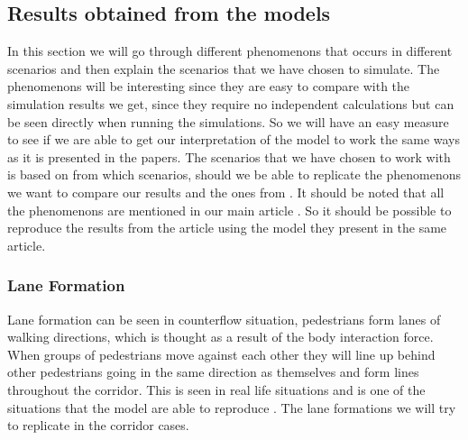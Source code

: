 \subsection{Results obtained from the models}
In this section we will go through different phenomenons that occurs in different scenarios and then
explain the scenarios that we have chosen to simulate. The phenomenons will be interesting since they
are easy to compare with the simulation results we get, since they require no independent calculations
but can be seen directly when running the simulations. So we will have an easy measure to see if we
are able to get our interpretation of the model to work the same ways as it is presented in the papers.
The scenarios that we have chosen to work with is based on from which scenarios, should we be able
to replicate the phenomenons we want to compare our results and the ones from \cite{self-org}.
It should be noted that all the phenomenons are mentioned in our main article \cite{self-org}.
So it should be possible to reproduce the results from the article using the model they present in the same article.

\subsubsection{Lane Formation}
Lane formation can be seen in counterflow situation, pedestrians form lanes of walking
directions, which is thought as a result of the body interaction force. When groups of pedestrians move against each other they will line up behind other
pedestrians going in the same direction as themselves and form lines throughout the corridor.
This is seen in real life situations and is one of the situations that the model are able to reproduce \cite{self-org}.
The lane formations we will try to replicate in the corridor cases.

